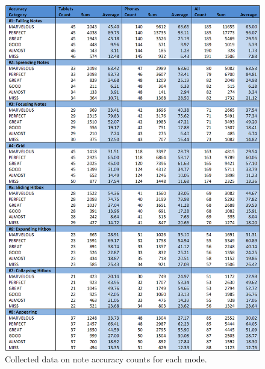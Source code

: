 \documentclass{sig-alternate}
\begin{document}
\begin{figure}[htb!]
	\begin{center}
		\includegraphics[width=1\linewidth]{figure_data_accuracy}
	\end{center}
	\vspace{-12pt}
	\caption{Collected data on note accuracy counts for each mode.}
	\label{fig:data_accuracy}
\end{figure}
\end{document}

